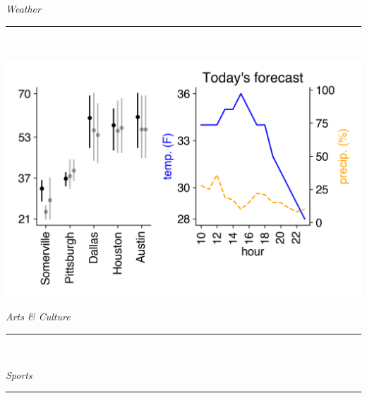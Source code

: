 \documentclass[landscape]{article}
\date{\today}
\renewcommand\headline[1]{\begin{center} {\huge \textsl{ #1}}\\ %
			\rule[5pt]{0.8\hsize}{0.5pt}\\ \end{center}}
\begin{document}
\maketitle

\begin{multicols}{3}
\headline{Weather}
\vspace{-0.5cm}\includegraphics[width=\linewidth]{images/weather.png}

\headline{Arts \& Culture}
\vspace{-0.3cm}


\noindent

\headline{Sports}
\vspace{-0.3cm}

\begin{center}
	
\end{center}


\end{multicols}
\end{document}
